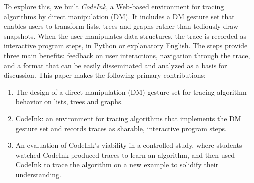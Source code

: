 To explore this, we built \emph{CodeInk}, a Web-based environment for tracing
algorithms by direct manipulation (DM). It includes a DM gesture set that
enables users to transform lists, trees and graphs rather than tediously draw
snapshots. When the user manipulates data structures, the trace is recorded as
interactive program steps, in Python or explanatory English. The steps provide
three main benefits: feedback on user interactions, navigation through the
trace, and a format that can be easily disseminated and analyzed as a basis for
discussion. This paper makes the following primary contributions:

\begin{enumerate}

\item The design of a direct manipulation (DM) gesture set for tracing algorithm
behavior on lists, trees and graphs.

\item CodeInk: an environment for tracing algorithms that implements the DM
gesture set and records traces as sharable, interactive program steps.

\item An evaluation of CodeInk's viability in a controlled study, where students
watched CodeInk-produced traces to learn an algorithm, and then used CodeInk to
trace the algorithm on a new example to solidify their understanding.

\end{enumerate}

